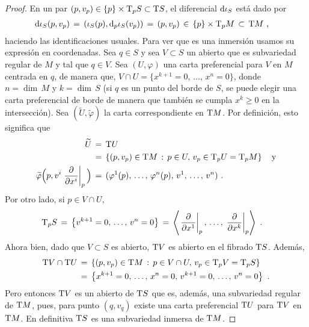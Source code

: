 \begin{proof}
	En un par $(p,v_{p})\in\{p\}\times\tangente[p]{S}\subset\tangente{S}$,
	el diferencial $\diferencial{\inc[S]}$ est\'{a} dado por
	\begin{align*}
		\diferencial{\inc[S]}(p,v_{p}) & \,=\,
			(\inc[S](p),\diferencial[p]{\inc[S]}(v_{p}))
		\,=\,(p,v_{p})\,\in\,\{p\}\times\tangente[p]{M}\,\subset\,
			\tangente{M}
		\text{ ,}
	\end{align*}
	haciendo las identificaciones usuales. Para ver que es una
	inmersi\'{o}n usamos su expresi\'{o}n en coordenadas. Sea $q\in S$
	y sea $V\subset S$ un abierto que es subvariedad regular de $M$
	y tal que $q\in V$. Sea $(U,\varphi)$ una carta preferencial para
	$V$ en $M$ centrada en $q$, de manera que,
	$V\cap U=\{x^{k+1}=0,\,\dots,\,x^{n}=0\}$, donde $n=\dim\,M$ y
	$k=\dim\,S$ (si $q$ es un punto del borde de $S$, se puede elegir
	una carta preferencial de borde de manera que tambi\'{e}n se cumpla
	$x^{k}\geq 0$ en la intersecci\'{o}n). Sea
	$(\widetilde{U},\widetilde{\varphi})$ la carta correspondiente en
	$\tangente{M}$. Por definici\'{o}n, esto significa que
	\begin{align*}
		\widetilde{U} & \,=\,\tangente{U} \\
		& \,=\,\left\lbrace (p,v_{p})\in\tangente{M}\,:\,
			p\in U,\,v_{p}\in\tangente[p]{U}=\tangente[p]{M}
			\right\rbrace \quad\text{y} \\
		\widetilde{\varphi}\Big(p,v^{i}\gancho[p]{x^{i}}\Big) &
			\,=\,(\varphi^{1}(p),\,\dots,\,\varphi^{n}(p),\,
				v^{1},\,\dots,\,v^{n})
		\text{ .}
	\end{align*}
	Por otro lado, si $p\in V\cap U$,
	\begin{align*}
		\tangente[p]{S} & \,=\,\left\lbrace
			v^{k+1}=0,\,\dots,\,v^{n}=0\right\rbrace
			\,=\,\generado{\gancho[p]{x^{1}},\,\dots,\,
				\gancho[p]{x^{k}}}
		\text{ .}
	\end{align*}
	Ahora bien, dado que $V\subset S$ es abierto,
	$\tangente{V}$ es abierto en el fibrado $\tangente{S}$. Adem\'{a}s,
	\begin{align*}
		\tangente{V}\cap\tangente{U} & \,=\,
			\left\lbrace (p,v_{p})\in\tangente{M}\,:\,
			p\in V\cap U,\,v_{p}\in\tangente[p]{V}=\tangente[p]{S}
			\right\rbrace \\
		& \,=\,\left\lbrace x^{k+1}=0,\,\dots,\,x^{n}=0,\,
			v^{k+1}=0,\,\dots,\,v^{n}=0\right\rbrace
		\text{ .}
	\end{align*}
	Pero entonces $\tangente{V}$ es un abierto de $\tangente{S}$
	que es, adem\'{a}s, una subvariedad regular de $\tangente{M}$,
	pues, para punto $(q,v_{q})$ existe una carta preferencial
	$\tangente{U}$ para $\tangente{V}$ en $\tangente{M}$.
	En definitiva $\tangente{S}$ es una subvariedad inmersa de
	$\tangente{M}$.
\end{proof}

